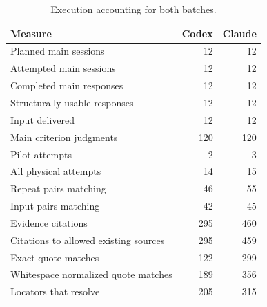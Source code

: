 \begin{table}[t]
\caption{Execution accounting for both batches.}
\label{tab:execution}
\centering\begin{tabular}{lrr}\toprule
Measure & Codex & Claude \\
\midrule
Planned main sessions & 12 & 12 \\
Attempted main sessions & 12 & 12 \\
Completed main responses & 12 & 12 \\
Structurally usable responses & 12 & 12 \\
Input delivered & 12 & 12 \\
Main criterion judgments & 120 & 120 \\
Pilot attempts & 2 & 3 \\
All physical attempts & 14 & 15 \\
Repeat pairs matching & 46 & 55 \\
Input pairs matching & 42 & 45 \\
Evidence citations & 295 & 460 \\
Citations to allowed existing sources & 295 & 459 \\
Exact quote matches & 122 & 299 \\
Whitespace normalized quote matches & 189 & 356 \\
Locators that resolve & 205 & 315 \\
\bottomrule\end{tabular}
\end{table}
